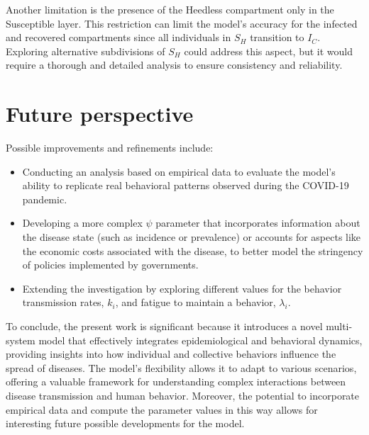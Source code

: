 Another limitation is the presence of the Heedless compartment only in the Susceptible layer. This restriction can limit the model's accuracy for the infected and recovered compartments since all individuals in $S_H$ transition to $I_C$. Exploring alternative subdivisions of $S_H$ could address this aspect, but it would require a thorough and detailed analysis to ensure consistency and reliability.



\section{Future perspective}

Possible improvements and refinements include:
\begin{itemize}
	\item Conducting an analysis based on empirical data to evaluate the model's ability to replicate real behavioral patterns observed during the COVID-19 pandemic.
	\item Developing a more complex $\psi$ parameter that incorporates information about the disease state (such as incidence or prevalence) or accounts for aspects like the economic costs associated with the disease, to better model the stringency of policies implemented by governments.
	\item Extending the investigation by exploring different values for the behavior transmission rates, $k_i$, and fatigue to maintain a behavior, $\lambda_i$.\\
\end{itemize}


\noindent To conclude, the present work is significant because it introduces a novel multi-system model that effectively integrates epidemiological and behavioral dynamics, providing insights into how individual and collective behaviors influence the spread of diseases. The model's flexibility allows it to adapt to various scenarios, offering a valuable framework for understanding complex interactions between disease transmission and human behavior. Moreover, the potential to incorporate empirical data and compute the parameter values in this way allows for interesting future possible developments for the model.